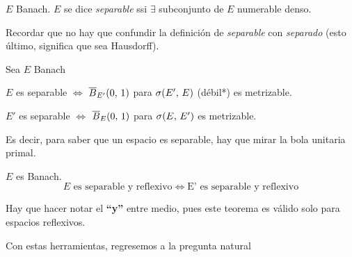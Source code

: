 \begin{defn}
$E$ Banach. $E$ se dice \textit{separable} ssi $\exists$ subconjunto de $E$ numerable denso.
\end{defn}

Recordar que no hay que confundir la definición de \textit{separable} con \textit{separado} (esto último, significa que sea Hausdorff).

\begin{thm} \label{teo1:Esp-Sep}
Sea $E$ Banach
\begin{ienumerate}
    \item $E$ es separable $\iff$ $\bolacerradaunitariaf[E']$ para $\topdebilestrE$ (débil*) es metrizable.
    \item $E'$ es separable $\iff$ $\bolacerradaunitariaf[E]$ para $\topdebilE$ es metrizable.
\end{ienumerate}
\end{thm}

Es decir, para saber que un espacio es separable, hay que mirar la bola unitaria primal.

\begin{thm}\label{teo2:Esp-Sep}
$E$ es Banach. 
\begin{equation}
    \text{$E$ es separable y reflexivo} \iff \text{E' es separable y reflexivo}
\end{equation}
\end{thm}

Hay que hacer notar el \textbf{``y''} entre medio, pues este teorema es válido solo para espacios reflexivos.

Con estas herramientas, regresemos a la pregunta natural